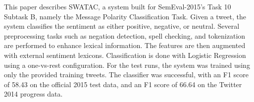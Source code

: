 This paper describes SWATAC, a system built for SemEval-2015's Task 10 Subtask B, namely the Message Polarity Classification Task. Given a tweet, the system classifies the sentiment as either positive, negative, or neutral. Several preprocessing tasks such as negation detection, spell checking, and tokenization are performed to enhance lexical information. The features are then augmented with external sentiment lexicons. Classification is done with Logistic Regression using a one-vs-rest configuration. For the test runs, the system was trained using only the provided training tweets. The classifier was successful, with an F1 score of 58.43 on the official 2015 test data, and an F1 score of 66.64 on the Twitter 2014 progress data.
